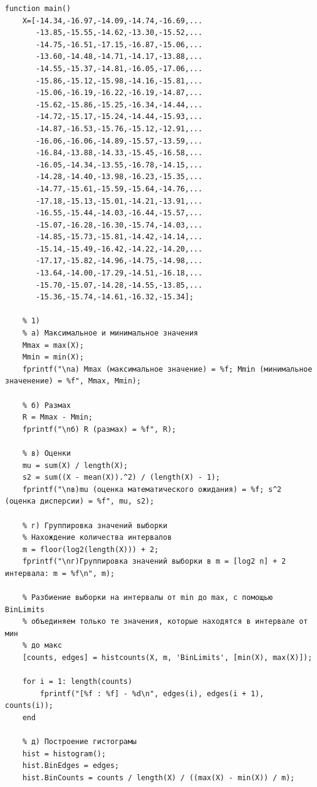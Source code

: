 \documentclass[a4paper,oneside,12pt]{extreport}
\theoremstyle{indented}
\begin{document}
\hfill 
\begin{lstlisting}[caption=Реализация]
function main()
    X=[-14.34,-16.97,-14.09,-14.74,-16.69,...
       -13.85,-15.55,-14.62,-13.30,-15.52,...
       -14.75,-16.51,-17.15,-16.87,-15.06,...
       -13.60,-14.48,-14.71,-14.17,-13.88,...
       -14.55,-15.37,-14.81,-16.05,-17.06,...
       -15.86,-15.12,-15.98,-14.16,-15.81,...
       -15.06,-16.19,-16.22,-16.19,-14.87,...
       -15.62,-15.86,-15.25,-16.34,-14.44,...
       -14.72,-15.17,-15.24,-14.44,-15.93,...
       -14.87,-16.53,-15.76,-15.12,-12.91,...
       -16.06,-16.06,-14.89,-15.57,-13.59,...
       -16.84,-13.88,-14.33,-15.45,-16.58,...
       -16.05,-14.34,-13.55,-16.78,-14.15,...
       -14.28,-14.40,-13.98,-16.23,-15.35,...
       -14.77,-15.61,-15.59,-15.64,-14.76,...
       -17.18,-15.13,-15.01,-14.21,-13.91,...
       -16.55,-15.44,-14.03,-16.44,-15.57,...
       -15.07,-16.28,-16.30,-15.74,-14.03,...
       -14.85,-15.73,-15.81,-14.42,-14.14,...
       -15.14,-15.49,-16.42,-14.22,-14.20,...
       -17.17,-15.82,-14.96,-14.75,-14.98,...
       -13.64,-14.00,-17.29,-14.51,-16.18,...
       -15.70,-15.07,-14.28,-14.55,-13.85,...
       -15.36,-15.74,-14.61,-16.32,-15.34];
    
    % 1)
    % а) Максимальное и минимальное значения
    Mmax = max(X);
    Mmin = min(X);
    fprintf("\nа) Mmax (максимальное значение) = %f; Mmin (минимальное значенение) = %f", Mmax, Mmin);
    
    % б) Размах
    R = Mmax - Mmin;
    fprintf("\nб) R (размах) = %f", R);
    
    % в) Оценки
    mu = sum(X) / length(X);
    s2 = sum((X - mean(X)).^2) / (length(X) - 1);
    fprintf("\nв)mu (оценка математического ожидания) = %f; s^2 (оценка дисперсии) = %f", mu, s2);
    
    % г) Группировка значений выборки
    % Нахождение количества интервалов
    m = floor(log2(length(X))) + 2;
    fprintf("\nг)Группировка значений выборки в m = [log2 n] + 2 интервала: m = %f\n", m);
    
    % Разбиение выборки на интервалы от min до max, с помощью BinLimits
    % объединяем только те значения, которые находятся в интервале от мин
    % до макс
    [counts, edges] = histcounts(X, m, 'BinLimits', [min(X), max(X)]);
    
    for i = 1: length(counts)
        fprintf("[%f : %f] - %d\n", edges(i), edges(i + 1), counts(i));
    end
    
    % д) Построение гистограмы
    hist = histogram();
    hist.BinEdges = edges;
    hist.BinCounts = counts / length(X) / ((max(X) - min(X)) / m);
    

\end{lstlisting}
\end{document}
